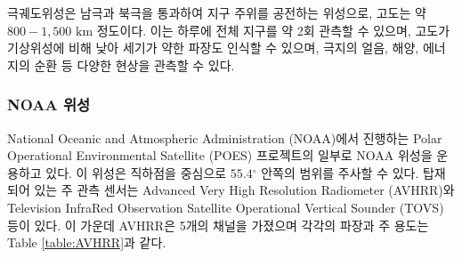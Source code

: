 극궤도위성은 남극과 북극을 통과하여 지구 주위를 공전하는 위성으로, 고도는 약 $800 - 1,500 \textrm{ km}$ 정도이다. 이는 하루에 전체 지구를 약 2회 관측할 수 있으며, 고도가 기상위성에 비해 낮아 세기가 약한 파장도 인식할 수 있으며, 극지의 얼음, 해양, 에너지의 순환 등 다양한 현상을 관측할 수 있다.


\subsubsection{NOAA 위성}

National Oceanic and Atmospheric Administration (NOAA)에서 진행하는 Polar Operational Environmental Satellite (POES) 프로젝트의 일부로 NOAA 위성을 운용하고 있다. 이 위성은 직하점을 중심으로 $55.4 {^\circ}$ 안쪽의 범위를 주사할 수 있다. 탑재되어 있는 주 관측 센서는 Advanced Very High Resolution Radiometer (AVHRR)와 Television InfraRed Observation Satellite Operational Vertical Sounder (TOVS) 등이 있다. 이 가운데 AVHRR은 5개의 채널을 가졌으며 각각의 파장과 주 용도는 Table \ref{table:AVHRR}과 같다.

